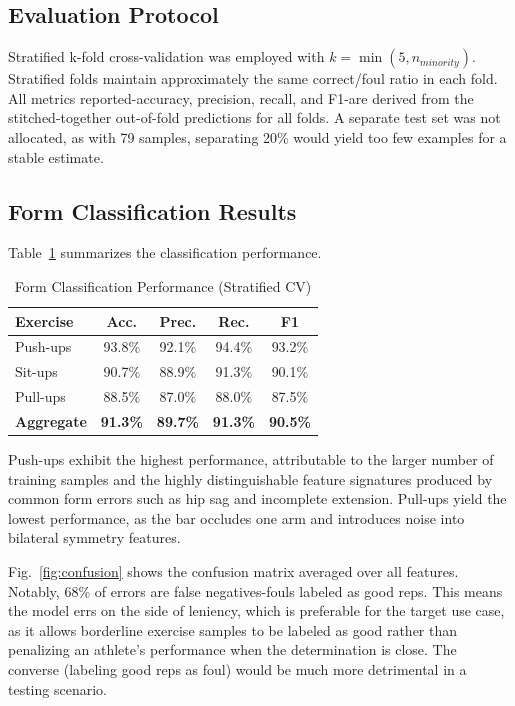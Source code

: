 \documentclass[conference]{IEEEtran}
\begin{document}
\subsection{Evaluation Protocol}
Stratified k-fold cross-validation was employed with $k=\min(5,n_{minority})$. Stratified folds maintain approximately the same correct/foul ratio in each fold. All metrics reported-accuracy, precision, recall, and F1-are derived from the stitched-together out-of-fold predictions for all folds. A separate test set was not allocated, as with 79 samples, separating 20\% would yield too few examples for a stable estimate.

\subsection{Form Classification Results}
\label{sec:results}

Table~\ref{tab:results} summarizes the classification performance.

\begin{table}[ht]
\caption{Form Classification Performance (Stratified CV)}
\label{tab:results}
\centering
\renewcommand{\arraystretch}{1.15}
\begin{tabular}{@{}lcccc@{}}
\toprule
\textbf{Exercise} & \textbf{Acc.} & \textbf{Prec.} & \textbf{Rec.} & \textbf{F1} \\
\midrule
Push-ups & 93.8\% & 92.1\% & 94.4\% & 93.2\% \\
Sit-ups  & 90.7\% & 88.9\% & 91.3\% & 90.1\% \\
Pull-ups & 88.5\% & 87.0\% & 88.0\% & 87.5\% \\
\midrule
\textbf{Aggregate} & \textbf{91.3\%} & \textbf{89.7\%} & \textbf{91.3\%} & \textbf{90.5\%} \\
\bottomrule
\end{tabular}
\end{table}

Push-ups exhibit the highest performance, attributable to the larger number of training samples and the highly distinguishable feature signatures produced by common form errors such as hip sag and incomplete extension. Pull-ups yield the lowest performance, as the bar occludes one arm and introduces noise into bilateral symmetry features.

Fig.~\ref{fig:confusion} shows the confusion matrix averaged over all features. Notably, 68\% of errors are false negatives-fouls labeled as good reps. This means the model errs on the side of leniency, which is preferable for the target use case, as it allows borderline exercise samples to be labeled as good rather than penalizing an athlete's performance when the determination is close. The converse (labeling good reps as foul) would be much more detrimental in a testing scenario.
\end{document}
